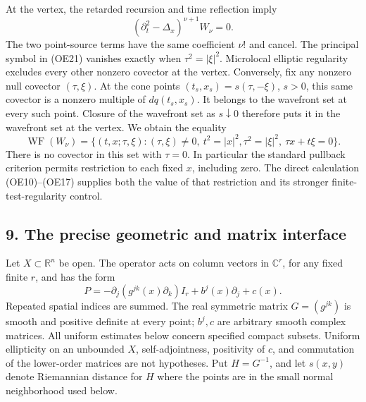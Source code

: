 \documentclass[
  11pt,
]{article}
\begin{document}
At the vertex, the retarded recursion and time reflection imply \[
 (\partial_t^2-\Delta_x)^{\nu+1}W_\nu=0.
 \tag{OE21}
\] The two point-source terms have the same coefficient \(\nu!\) and
cancel. The principal symbol in (OE21) vanishes exactly when
\(\tau^2=|\xi|^2\). Microlocal elliptic regularity excludes every other
nonzero covector at the vertex. Conversely, fix any nonzero null
covector \((\tau,\xi)\). At the cone points \((t_s,x_s)=s(\tau,-\xi)\),
\(s>0\), this same covector is a nonzero multiple of \(dq(t_s,x_s)\). It
belongs to the wavefront set at every such point. Closure of the
wavefront set as \(s\downarrow0\) therefore puts it in the wavefront set
at the vertex. We obtain the equality \[
 \operatorname{WF}(W_\nu)=
 \{(t,x;\tau,\xi):
   (\tau,\xi)\ne0,\ t^2=|x|^2,
   \tau^2=|\xi|^2,\ \tau x+t\xi=0\}.
 \tag{OE22}
\] There is no covector in this set with \(\tau=0\). In particular the
standard pullback criterion permits restriction to each fixed \(x\),
including zero. The direct calculation (OE10)--(OE17) supplies both the
value of that restriction and its stronger finite-test-regularity
control.

\subsection{9. The precise geometric and matrix
interface}\label{the-precise-geometric-and-matrix-interface}

Let \(X\subset\mathbb R^n\) be open. The operator acts on column vectors
in \(\mathbb C^r\), for any fixed finite \(r\), and has the form \[
 P=-\partial_j(g^{jk}(x)\partial_k)I_r+b^j(x)\partial_j+c(x).
 \tag{WG1}
\] Repeated spatial indices are summed. The real symmetric matrix
\(G=(g^{jk})\) is smooth and positive definite at every point; \(b^j,c\)
are arbitrary smooth complex matrices. All uniform estimates below
concern specified compact subsets. Uniform ellipticity on an unbounded
\(X\), self-adjointness, positivity of \(c\), and commutation of the
lower-order matrices are not hypotheses. Put \(H=G^{-1}\), and let
\(s(x,y)\) denote Riemannian distance for \(H\) where the points are in
the small normal neighborhood used below.
\end{document}
